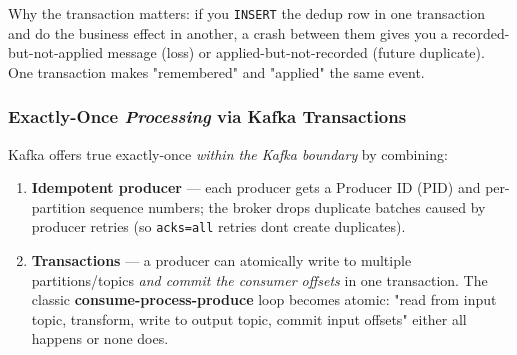 \documentclass[11pt]{article}
\providecommand{\tightlist}{\setlength{\itemsep}{1pt}\setlength{\parskip}{0pt}}
\begin{document}
Why the transaction matters: if you \texttt{INSERT} the dedup row in one transaction and do the business effect in another, a crash between them gives you a recorded-but-not-applied message (loss) or applied-but-not-recorded (future duplicate). One transaction makes "remembered" and "applied" the same event.

\subsubsection{\texorpdfstring{Exactly-Once \emph{Processing} via Kafka Transactions}{Exactly-Once Processing via Kafka Transactions}}\label{exactly-once-processing-via-kafka-transactions}

Kafka offers true exactly-once \emph{within the Kafka boundary} by combining:

\begin{enumerate}
\def\labelenumi{\arabic{enumi}.}
\tightlist
\item
  \textbf{Idempotent producer} --- each producer gets a Producer ID (PID) and per-partition sequence numbers; the broker drops duplicate batches caused by producer retries (so \texttt{acks=all} retries don\textquotesingle t create duplicates).
\item
  \textbf{Transactions} --- a producer can atomically write to multiple partitions/topics \emph{and commit the consumer offsets} in one transaction. The classic \textbf{consume-process-produce} loop becomes atomic: "read from input topic, transform, write to output topic, commit input offsets" either all happens or none does.
\end{enumerate}

\end{document}
